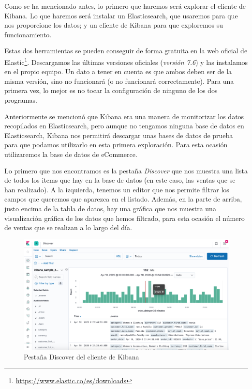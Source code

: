 \documentclass[a4paper, 12pt]{book}
\begin{document}
Como se ha mencionado antes, lo primero que haremos será explorar el cliente de Kibana. Lo que haremos será instalar un Elasticsearch, que usaremos para que nos proporcione los datos; y un cliente de Kibana para que exploremos su funcionamiento.

Estas dos herramientas se pueden conseguir de forma gratuita en la web oficial de Elastic\footnote{\url{https://www.elastic.co/es/downloads}}. Descargamos las últimas versiones oficiales (\textit{versión 7.6}) y las instalamos en el propio equipo. Un dato a tener en cuenta es que ambos deben ser de la misma versión, sino no funcionará (o no funcionará correctamente). Para una primera vez, lo mejor es no tocar la configuración de ninguno de los dos programas.

Anteriormente se mencionó que Kibana era una manera de monitorizar los datos recopilados en Elasticsearch, pero aunque no tengamos ninguna base de datos en Elasticsearch, Kibana nos permitirá descargar unas bases de datos de prueba para que podamos utilizarlo en esta primera exploración. Para esta ocasión utilizaremos la base de datos de eCommerce.

Lo primero que nos encontramos es la pestaña \textit{Discover} que nos muestra una lista de todos los items que hay en la base de datos (en este caso, las ventas que se han realizado). A la izquierda, tenemos un editor que nos permite filtrar los campos que queremos que aparezca en el listado. Además, en la parte de arriba, justo encima de la tabla de datos, hay una gráfica que nos muestra una visualización gráfica de los datos que hemos filtrado, para esta ocasión el número de ventas que se realizan a lo largo del día.

\begin{figure}[H]
  \centering
  \includegraphics[width=12cm, keepaspectratio]{img/development/Discover-kibana.png}
  \caption{Pestaña Discover del cliente de Kibana}
  \label{fig:Kibanadiscover}
\end{figure}
\end{document}
